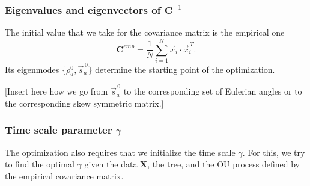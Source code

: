 \documentclass[preprint,amsmath,amssymb,superscriptaddress,showpacs,pre]{revtex4-1}
\let\originalleft\left
\let\originalright\right
\renewcommand{\left}{\mathopen{}\mathclose\bgroup\originalleft}
\renewcommand{\right}{\aftergroup\egroup\originalright}
\def\vx{\vec x}
\newcommand{\vsa}{\vec{s}_a}
\begin{document}
	\subsubsection{Eigenvalues and eigenvectors of $\mathbf{C}^{-1}$} %
	\label{ssub:eigenvalues_and_eigenvectors}

	The initial value that we take for the covariance matrix is the empirical one
	\begin{equation*}
		\mathbf{C}^{emp} = \frac{1}{N}\sum_{i=1}^{N}\vx_i \cdot\vx_i^{\,T}.
	\end{equation*}
	Its eigenmodes $\{\rho^0_a, \vsa^{\,0}\}$ determine the starting point of the optimization. 

	[Insert here how we go from $\vsa^{\,0}$ to the corresponding set of Eulerian angles or to the corresponding skew symmetric matrix.]





	\subsubsection{Time scale parameter $\gamma$}

	The optimization also requires that we initialize the time scale $\gamma$. 
	For this, we try to find the optimal $\gamma$ given the data $\mathbf{X}$, the tree, and the OU process defined by the empirical covariance matrix. 
\end{document}
